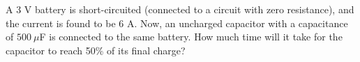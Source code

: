 \newcommand{\current}{6 A}
\newcommand{\capacitor}{$500\ \mu$F}
\question A 3 V battery is short-circuited (connected to a circuit with zero resistance), and the current is found to be \current. Now, an uncharged capacitor with a capacitance of \capacitor{} is connected to the same battery. How much time will it take for the capacitor to reach 50\% of its final charge?